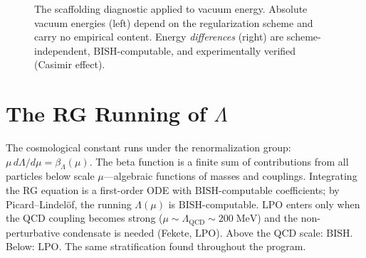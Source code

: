 \documentclass[11pt,a4paper]{report}
\theoremstyle{plain}
\theoremstyle{definition}
\theoremstyle{remark}
\newcommand{\BISH}{\mathrm{BISH}}
\newcommand{\LPO}{\mathrm{LPO}}
\begin{document}
\begin{figure}[ht]
\centering
{}
\caption{The scaffolding diagnostic applied to vacuum energy. Absolute vacuum energies (left) depend on the regularization scheme and carry no empirical content. Energy \emph{differences} (right) are scheme-independent, $\BISH$-computable, and experimentally verified (Casimir effect).}
\label{fig:scaffolding-diag}
\end{figure}

\section{The RG Running of $\Lambda$}

The cosmological constant runs under the renormalization group: $\mu\, d\Lambda/d\mu = \beta_\Lambda(\mu)$. The beta function is a finite sum of contributions from all particles below scale $\mu$---algebraic functions of masses and couplings. Integrating the RG equation is a first-order ODE with $\BISH$-computable coefficients; by Picard--Lindel\"of, the running $\Lambda(\mu)$ is $\BISH$-computable. $\LPO$ enters only when the QCD coupling becomes strong ($\mu \sim \Lambda_{\mathrm{QCD}} \sim 200\;\mathrm{MeV}$) and the non-perturbative condensate is needed (Fekete, $\LPO$). Above the QCD scale: $\BISH$. Below: $\LPO$. The same stratification found throughout the program.
\end{document}
